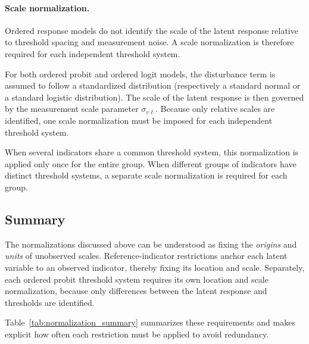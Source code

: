 \documentclass[12pt,a4paper]{article}
\begin{document}
\paragraph{Scale normalization.}
Ordered response models do not identify the scale of the latent
response relative to threshold spacing and measurement noise. A scale
normalization is therefore required for each independent threshold
system.

For both ordered probit and ordered logit models, the disturbance term
is assumed to follow a standardized distribution (respectively a
standard normal or a standard logistic distribution). The scale of the
latent response is then governed by the measurement scale parameter
\(\sigma_{\upsilon\ell}\). Because only relative scales are
identified, one scale normalization must be imposed for each
independent threshold system.

When several indicators share a common threshold system, this
normalization is applied only once for the entire group. When
different groups of indicators have distinct threshold systems, a
separate scale normalization is required for each group.


\subsection{Summary}

The normalizations discussed above can be understood as fixing the
\emph{origins} and \emph{units} of unobserved
scales. Reference-indicator restrictions anchor each latent variable
to an observed indicator, thereby fixing its location and
scale. Separately, each ordered probit threshold system requires its
own location and scale normalization, because only differences between
the latent response and thresholds are identified.

Table~\ref{tab:normalization_summary} summarizes these requirements
and makes explicit how often each restriction must be applied to avoid
redundancy.
\end{document}
